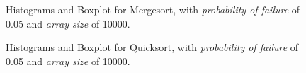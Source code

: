 \begin{figure}[H]
    \centering
    \caption{Histograms and Boxplot for Mergesort, with \textit{probability of failure} of 0.05 and \textit{array size} of 10000.}
    \label{fig-histogram-boxplot-merge-00510000}
\end{figure}

\begin{figure}[H]
    \centering
    \caption{Histograms and Boxplot for Quicksort, with \textit{probability of failure} of 0.05 and \textit{array size} of 10000.}
    \label{fig-histogram-boxplot-quick-00510000}
\end{figure}

